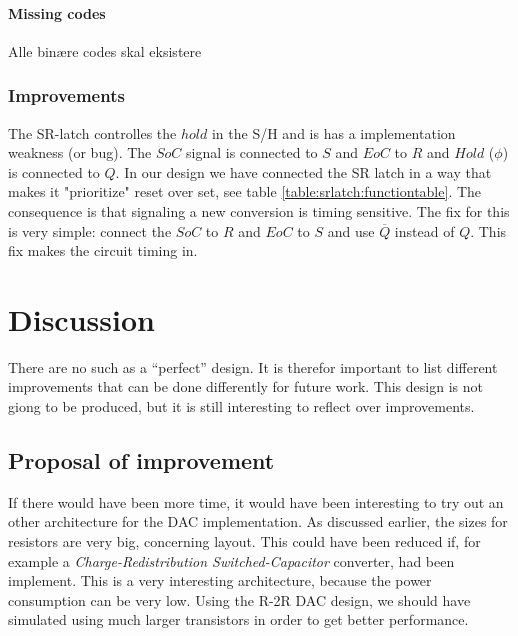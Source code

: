 \documentclass[english, 12pt, a4paper]{ifimaster}
\begin{document}
\subsubsection{Missing codes}
Alle binære codes skal eksistere

\subsection{Improvements}
The SR-latch controlles the \(hold\) in the S/H and is has a implementation weakness (or bug). The \(SoC\) signal is connected to \(S\) and \(EoC\) to  \(R\) and \(Hold\) (\(\phi\)) is connected to \(Q\). 
In our design we have connected the SR latch in a way that makes it "prioritize" reset over set, see table \ref{table:srlatch:functiontable}.
The consequence is that signaling a new conversion is timing sensitive.
The fix for this is very simple: connect the \(SoC\) to \(R\) and \(EoC\) to \(S\) and use \(\overline{Q}\) instead of \(Q\). This fix makes the circuit timing in.


\chapter{Discussion}
There are no such as a ``perfect'' design. It is therefor important to list different improvements that
can be done differently for future work. This design is not giong to be produced, but it is still 
interesting to reflect over improvements. 

\section{Proposal of improvement}
If there would have been more time, it would have been interesting to try out an other architecture
for the DAC implementation. As discussed earlier, the sizes for resistors are very big, concerning
layout. This could have been reduced if, for example a \textit{Charge-Redistribution Switched-Capacitor} 
converter, had been implement. This is a very interesting architecture, because the power consumption
can be very low. 
Using the R-2R DAC design, we should have simulated using much larger transistors in order to get better performance.

\end{document}
